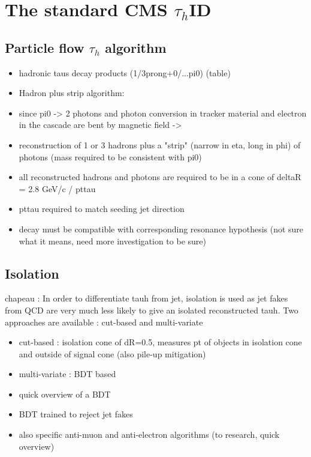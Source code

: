 \section{The standard CMS $\tau_{h}$ID}

\subsection{Particle flow $\tau_{h}$ algorithm}

\begin{itemize}
    \item hadronic taus decay products (1/3prong+0/...pi0) (table)
    \item Hadron plus strip algorithm:
    \item since pi0 -> 2 photons and photon conversion in tracker material and electron in the cascade are bent by magnetic field ->
    \item reconstruction of 1 or 3 hadrons plus a "strip" (narrow in eta, long in phi) of photons (mass required to be consistent with pi0)
    \item all reconstructed hadrons and photons are required to be in a cone of deltaR = 2.8 GeV/c / pttau
    \item pttau required to match seeding jet direction
    \item decay must be compatible with corresponding resonance hypothesis (not sure what it means, need more investigation to be sure)
\end{itemize}

\subsection{Isolation}
chapeau : In order to differentiate tauh from jet, isolation is used as jet fakes from QCD are very much less likely to give an isolated reconstructed tauh. Two approaches are available : cut-based and multi-variate

\begin{itemize}
    \item cut-based : isolation cone of dR=0.5, measures pt of objects in isolation cone and outside of signal cone (also pile-up mitigation)
    \item multi-variate : BDT based
    \item quick overview of a BDT
    \item BDT trained to reject jet fakes
    \item also specific anti-muon and anti-electron algorithms (to research, quick overview)
\end{itemize}

